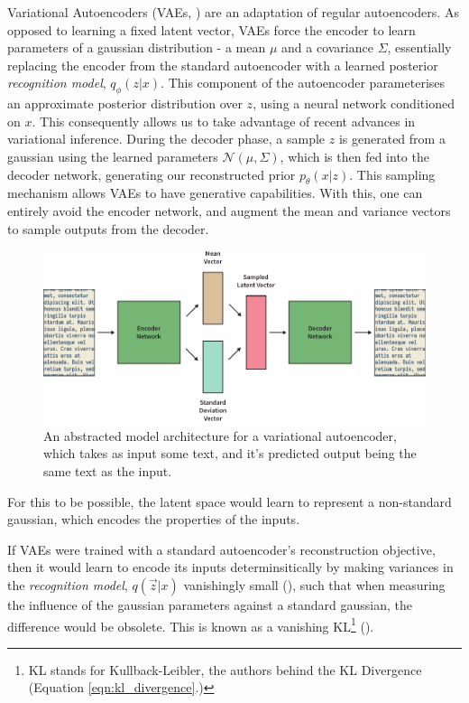 \documentclass[12pt,twoside]{report}
\begin{document}
Variational Autoencoders (VAEs, \cite{kingma_auto-encoding_2013}) are an adaptation of regular autoencoders. As opposed to learning a fixed latent vector, VAEs force the encoder to learn parameters of a gaussian distribution - a mean $\mu$ and a covariance $\Sigma$, essentially replacing the encoder from the standard autoencoder with a learned posterior \textit{recognition model}, $q_\phi(z|x)$. This component of the autoencoder parameterises an approximate posterior distribution over $z$, using a neural network conditioned on $x$. This consequently allows us to take advantage of recent advances in variational inference.  During the decoder phase, a sample $z$ is generated from a gaussian using the learned parameters $\mathcal{N}(\mu, \Sigma)$, which is then fed into the decoder network, generating our reconstructed prior  $p_\theta(x|z)$. This sampling mechanism allows VAEs to have generative capabilities. With this, one can entirely avoid the encoder network, and augment the mean and variance vectors to sample outputs from the decoder.

\begin{figure}[!ht]
	\centering
	\includegraphics[width=150mm]{diagrams/variational_autoencoders.pdf}
	\caption{An abstracted model architecture for a variational autoencoder, which takes as input some text, and it's predicted output being the same text as the input.\label{vae}}
	\end{figure}
	
For this to be possible, the latent space would learn to represent a non-standard gaussian, which encodes the properties of the inputs.

If VAEs were trained with a standard autoencoder's reconstruction objective, then it would learn to encode its inputs determinsitically by making variances in the \textit{recognition model}, $q(\overrightarrow{z}|x)$ vanishingly small (\cite{raiko_techniques_2014}), such that when measuring the influence of the gaussian parameters against a standard gaussian, the difference would be obsolete. This is known as a vanishing KL\footnote{KL stands for Kullback-Leibler, the authors behind the KL Divergence (Equation \ref{eqn:kl_divergence}.)} (\cite{fu*_cyclical_2019}). 
\end{document}
